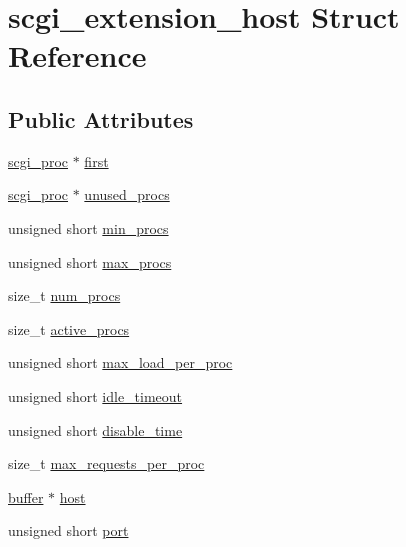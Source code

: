 \hypertarget{structscgi__extension__host}{\section{scgi\-\_\-extension\-\_\-host Struct Reference}
\label{structscgi__extension__host}
}
\subsection*{Public Attributes}
\begin{DoxyCompactItemize}
\item 
\hyperlink{structscgi__proc}{scgi\-\_\-proc} $\ast$ \hyperlink{structscgi__extension__host_a68199e6f02bf1777843aea32a55bc7c1}{first}
\item 
\hyperlink{structscgi__proc}{scgi\-\_\-proc} $\ast$ \hyperlink{structscgi__extension__host_ab7fa2ce21a64cae0964585c22f34aec6}{unused\-\_\-procs}
\item 
unsigned short \hyperlink{structscgi__extension__host_a9965fe62e6e7ed80a052dfaf496a70ae}{min\-\_\-procs}
\item 
unsigned short \hyperlink{structscgi__extension__host_a84c4582067a8474d7547b8a81cc95a2d}{max\-\_\-procs}
\item 
size\-\_\-t \hyperlink{structscgi__extension__host_a31a57d075947d2f454eda8c476f44e21}{num\-\_\-procs}
\item 
size\-\_\-t \hyperlink{structscgi__extension__host_af1e0d0b7eb7dd62abea007374c25cac4}{active\-\_\-procs}
\item 
unsigned short \hyperlink{structscgi__extension__host_a15116f4d7279692537ff2214bd55e6fe}{max\-\_\-load\-\_\-per\-\_\-proc}
\item 
unsigned short \hyperlink{structscgi__extension__host_a4cebe533f3a1c863e6f363e60cfc3d02}{idle\-\_\-timeout}
\item 
unsigned short \hyperlink{structscgi__extension__host_a4cd200c0ffcffef09e122e14571e0b64}{disable\-\_\-time}
\item 
size\-\_\-t \hyperlink{structscgi__extension__host_a554b32a3386e1a5dd9f3c1e35b6248af}{max\-\_\-requests\-\_\-per\-\_\-proc}
\item 
\hyperlink{structbuffer}{buffer} $\ast$ \hyperlink{structscgi__extension__host_a19333859ef63c093f691c59528426bcd}{host}
\item 
unsigned short \hyperlink{structscgi__extension__host_ac00f564db00d88a8aab2c20fa23cb308}{port}
\item 

\end{DoxyCompactItemize}
